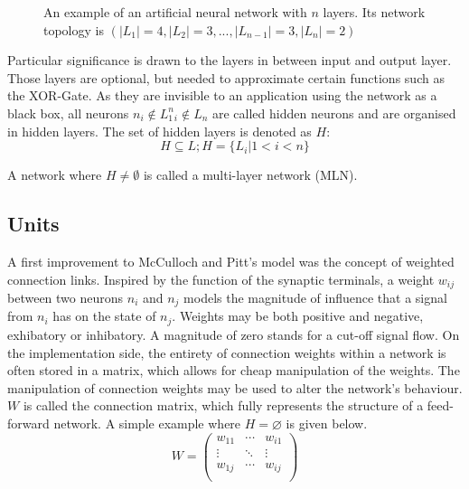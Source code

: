 \documentclass[10pt,a4paper,DIV=11]{scrreprt}
\let\oldemptyset\emptyset
\let\emptyset\varnothing
\begin{document}
\begin{figure}[H]
\caption{An example of an artificial neural network with $n$ layers. Its network topology is $(|L_1|=4,|L_2|=3,...,|L_{n-1}|=3,|L_n|=2)$}
\label{fig:layer}
\end{figure}

Particular significance is drawn to the layers in between input and output layer. Those layers are optional, but needed to approximate certain 
functions such as the XOR-Gate. As they are invisible to an application using the network as a black box, all neurons $n_i \notin L_1 ^ n_i \notin L_n$
are called hidden neurons and are organised in hidden layers. The set of hidden layers is denoted as $H$: 
\begin{equation}
H \subseteq L; H = \{L_i|1<i<n\}
\end{equation} 

A network where $H \neq \oldemptyset$ is called a multi-layer network (MLN). 

\subsection{Units}
\label{subsec:weights}

A first improvement to McCulloch and Pitt's model was the concept of weighted connection links. Inspired by the function of the synaptic 
terminals, a weight $w_{ij}$ between two neurons $n_i$ and $n_j$ models the magnitude of influence that a signal from $n_i$ has on the state of $n_j$.
Weights may be both positive and negative, exhibatory or inhibatory. A magnitude of zero stands for a cut-off signal flow. 
On the implementation side, the entirety of connection weights within a network is often stored in a matrix, which allows for cheap manipulation of the weights. 
The manipulation of connection weights may be used to alter the network's behaviour. $W$ is called the connection matrix, which fully represents 
the structure of a feed-forward network. A simple example where $H = \emptyset$ is given below. 
\begin{equation}
W = 
\begin{pmatrix}
w_{11} & \cdots & w_{i1} \\
\vdots & \ddots & \vdots \\
w_{1j} & \cdots & w_{ij} \\
\end{pmatrix}
\end{equation}
\end{document}
